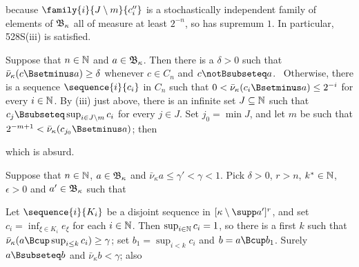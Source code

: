 {

\noindent because $\family{i}{J\setminus m}{c''_i}$ is a stochastically
independent family of elements of $\frak B_{\kappa}$
all of measure at least $2^{-n}$, so has supremum $1$.
In particular, 528S(iii) is satisfied.

\medskip

 Suppose that $n\in\Bbb N$ and $a\in\frak B_{\kappa}$.
Then there
is a $\delta>0$ such that $\bar\nu_{\kappa}(c\Bsetminus a)\ge\delta$ whenever
$c\in C_n$ and $c\notBsubseteq a$.  \Prf\Quer\
Otherwise, there is a sequence $\sequence{i}{c_i}$
in $C_n$ such that $0<\bar\nu_{\kappa}(c_i\Bsetminus a)\le 2^{-i}$ for every
$i\in\Bbb N$.   By (iii) just above, there is an infinite set
$J\subseteq\Bbb N$ such that
$c_j\Bsubseteq\sup_{i\in J\setminus m}c_i$ for every $j\in J$.
Set $j_0=\min J$, and let $m$ be such that
$2^{-m+1}<\bar\nu_{\kappa}(c_{j_0}\Bsetminus a)$;  then

\Centerline{$2^{-m+1}<\bar\nu_{\kappa}(\sup_{j\in J\setminus m}c_j\Bsetminus a)
\le\sum_{j=m}^{\infty}\bar\nu_{\kappa}(c_j\Bsetminus a)\le 2^{-m+1}$,}

\noindent which is absurd.\ \Bang\Qed

\medskip

 Suppose that $n\in\Bbb N$, $a\in\frak B_{\kappa}$ and
$\bar\nu_{\kappa} a\le\gamma'<\gamma<1$.   Pick
$\delta>0$, $r>n$, $k^*\in\Bbb N$, $\epsilon>0$ and $a'\in\frak B_{\kappa}$
such that






Let $\sequence{i}{K_i}$ be a
disjoint sequence in $[\kappa\setminus\supp a']^r$, and set
$c_i=\inf_{\xi\in K_i}e_{\xi}$ for each $i\in\Bbb N$.
Then $\sup_{i\in\Bbb N}c_i=1$, so there is a first $k$ such that
$\bar\nu_{\kappa}(a\Bcup\sup_{i\le k}c_i)\ge\gamma$;  set $b_1=\sup_{i<k}c_i$
and $b=a\Bcup b_1$.
Surely $a\Bsubseteq b$ and $\bar\nu_{\kappa} b<\gamma$;  also

}
